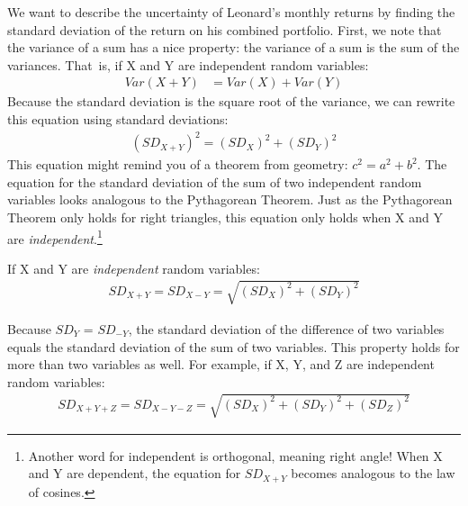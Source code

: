We want to describe the uncertainty of Leonard's monthly returns by finding the standard deviation of the return on his combined portfolio. First, we note that the variance of a sum has a nice property: the variance of a sum is the sum of the variances. That~is, if X and Y are independent random variables:
\begin{align*}
Var(X + Y) &= Var(X) + Var(Y)
\end{align*}
Because the standard deviation is the square root of the variance, we can rewrite this equation using standard deviations:
\begin{align*}
(SD_{X + Y})^2 = (SD_X)^2 + (SD_Y)^2
\end{align*}
This equation might remind you of a theorem from geometry:  $c^2 = a^2 + b^2$. The equation for the standard deviation of the sum of two independent random variables looks analogous to the Pythagorean Theorem. Just as the Pythagorean Theorem only holds for right triangles, this equation only holds when X and Y are \emph{independent}.\footnote{Another word for independent is orthogonal, meaning right angle!  When X and Y are dependent, the equation for $SD_{X+Y}$ becomes analogous to the law of cosines.}

\begin{termBox}{
If X and Y are \emph{independent} random variables:
\begin{align*}
SD_{X + Y} = SD_{X - Y} = \sqrt{(SD_X)^2 + (SD_Y)^2}
\end{align*}
}
\end{termBox}

Because $SD_Y$ = $SD_{-Y}$, the standard deviation of the difference of two variables equals the standard deviation of the sum of two variables. This property holds for more than two variables as well. For example, if X, Y, and Z are independent random variables:
\begin{align}
SD_{X + Y + Z} = SD_{X - Y - Z}  = \sqrt{(SD_X)^2 + (SD_Y)^2 + (SD_Z)^2}
\end{align}

